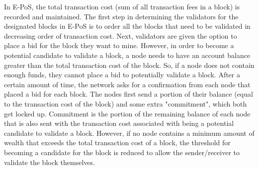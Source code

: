 In E-PoS, the total transaction cost (sum of all transaction fees in a block) is recorded and maintained.
The first step in determining the validators for the designated blocks in E-PoS is to order all the blocks that need to be validated in decreasing order of transaction cost. Next, validators are given the option to place a bid for the block they want to mine. However, in order to become a potential candidate to validate a block, a node needs to have an account balance greater than the total transaction cost of the block. So, if a node does not contain enough funds, they cannot place a bid to potentially validate a block. After a certain amount of time, the network asks for a confirmation from each node that placed a bid for each block. The nodes first send a portion of their balance (equal to the transaction cost of the block) and some extra "commitment", which both get locked up. Commitment is the portion of the remaining balance of each node that is also sent with the transaction cost associated with being a potential candidate to validate a block. However, if no node contains a minimum amount of wealth that exceeds the total transaction cost of a block, the threshold for becoming a candidate for the block is reduced to allow the sender/receiver to validate the block themselves.

